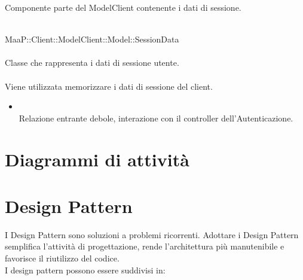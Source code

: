 Componente parte del ModelClient contenente i dati di sessione.

	\\
	MaaP::Client::ModelClient::Model::SessionData\\
	\\
	Classe che rappresenta i dati di sessione utente.\\
	\\
	Viene utilizzata memorizzare i dati di sessione del client.\\
	\begin{itemize}
	\item{}\\
	Relazione entrante debole, interazione con il controller dell'Autenticazione.
	\end{itemize}



\newpage
\section{Diagrammi di attività}




\newpage
\section{Design Pattern}
I Design Pattern sono soluzioni a problemi ricorrenti. Adottare i Design Pattern semplifica l'attività di progettazione, rende l'architettura più manutenibile e favorisce il riutilizzo del codice.\\
I design pattern possono essere suddivisi in:

